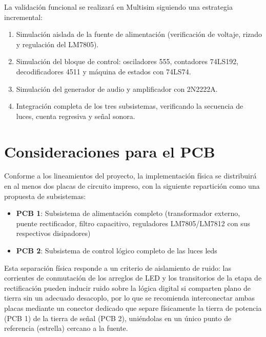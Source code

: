 \documentclass[10pt,onecolumn]{IEEEtran}
\begin{document}
La validación funcional se realizará en Multisim siguiendo una estrategia incremental:

\begin{enumerate}
    \item Simulación aislada de la fuente de alimentación (verificación de voltaje, rizado y regulación del LM7805).
    \item Simulación del bloque de control: osciladores 555, contadores 74LS192, decodificadores 4511 y máquina de estados con 74LS74.
    \item Simulación del generador de audio y amplificador con 2N2222A.
    \item Integración completa de los tres subsistemas, verificando la secuencia de luces, cuenta regresiva y señal sonora.
\end{enumerate}


\section{Consideraciones para el PCB}

Conforme a los lineamientos del proyecto, la implementación física se distribuirá en al menos dos placas de circuito impreso, con la siguiente repartición como una propuesta de subsistemas:

\begin{itemize}
    \item \textbf{PCB 1}: Subsistema de alimentación completo (transformador externo, puente rectificador, filtro capacitivo, reguladores LM7805/LM7812 con sus respectivos disipadores)
    \item \textbf{PCB 2}: Subsistema de control lógico completo de las luces leds
\end{itemize}

Esta separación física responde a un criterio de aislamiento de ruido: las corrientes de conmutación de los arreglos de LED y los transitorios de la etapa de rectificación pueden inducir ruido sobre la lógica digital si comparten plano de tierra sin un adecuado desacoplo, por lo que se recomienda interconectar ambas placas mediante un conector dedicado que separe físicamente la tierra de potencia (PCB 1) de la tierra de señal (PCB 2), uniéndolas en un único punto de referencia (estrella) cercano a la fuente.

\end{document}
